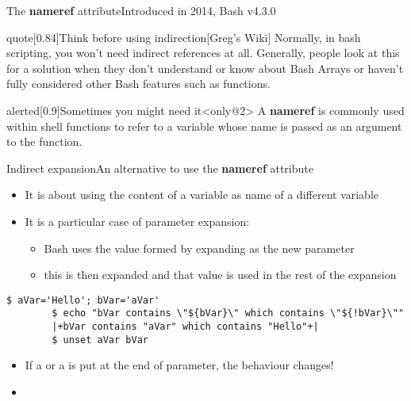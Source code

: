\begin{frame}[fragile]{The \textbf{nameref} attribute}{Introduced in 2014, Bash v4.3.0}
\begin{varblock}{quote}[0.84\textwidth]{Think before using indirection}[Greg's Wiki]
        \smallskip
        Normally, in bash scripting, you won't need indirect references at all.
        Generally, people look at this for a solution when they don't understand or know about Bash Arrays or haven't fully considered other Bash features such as functions.
        \smallskip
    \end{varblock}
    \begin{varblock}{alerted}[0.9\textwidth]{Sometimes you might need it}<only@2>
        A \textbf{nameref} is commonly used within shell functions to refer to a variable whose name is passed as an argument to the function.
    \end{varblock}
\end{frame}
\begin{frame}[fragile]{Indirect expansion}{An alternative to use the \textbf{nameref} attribute}
    \vspace{-3mm}
    \begin{itemize}
        \item It is about using the content of a variable as name of a different variable\\[1.5mm]
        \item It is a particular case of parameter expansion: 
              \begin{itemize}
                  \item Bash uses the value formed by expanding  as the new parameter
                  \item this is then expanded and that value is used in the rest of the expansion
              \end{itemize}
    \end{itemize}
    \begin{lstlisting}[style=MyBash, xrightmargin=1mm, aboveskip=2.5mm, belowskip=-4mm]
        $ aVar='Hello'; bVar='aVar'
        $ echo "bVar contains \"${bVar}\" which contains \"${!bVar}\""
        |+bVar contains "aVar" which contains "Hello"+|
        $ unset aVar bVar
    \end{lstlisting}
    \vspace{2mm}
    \begin{itemize}[<2->]
        \item If a \PB{\texttt{*}} or a  is put at the end of parameter, the behaviour changes!\\[0.3em]
        \small\setlength{\itemsep}{0mm}
        \item[] 

\end{itemize}
\end{frame}
